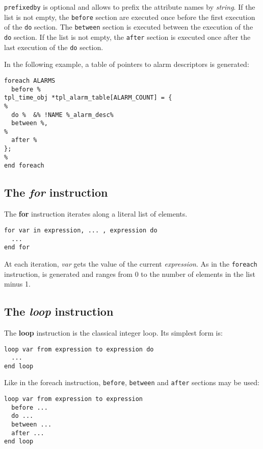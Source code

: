 {\tt prefixedby} is optional and allows to prefix the attribute names by {\em string}. If the list is not empty, the {\tt before} section are executed once before the first execution of the {\tt do} section. The {\tt between} section is executed between the execution of the {\tt do} section.  If the list is not empty, the {\tt after} section is executed once after the last execution of the {\tt do} section.

In the following example, a table of pointers to alarm descriptors is generated:

\begin{lstlisting}
foreach ALARMS
  before %
tpl_time_obj *tpl_alarm_table[ALARM_COUNT] = {
%
  do %  &% !NAME %_alarm_desc%
  between %,
%
  after %
};
%
end foreach
\end{lstlisting}

\subsection{The {\em for} instruction}

The {\bf for} instruction iterates along a literal list of elements.

\begin{lstlisting}
for var in expression, ... , expression do
  ...
end for
\end{lstlisting}

At each iteration, {\em var} gets the value of the current {\em expression}. As in the {\tt foreach} instruction,  is generated and ranges from 0 to the number of elements in the list minus 1.

\subsection{The {\em loop} instruction}

The {\bf loop} instruction is the classical integer loop. Its simplest form is:

\begin{lstlisting}
loop var from expression to expression do
  ...
end loop
\end{lstlisting}

Like in the foreach instruction, {\tt before},  {\tt between} and  {\tt after} sections may be used:

\begin{lstlisting}
loop var from expression to expression
  before ...
  do ...
  between ...
  after ...
end loop
\end{lstlisting}



